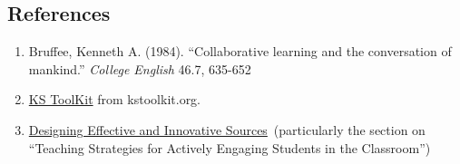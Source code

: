 \subsection{References}

\begin{enumerate}
\itemsep1pt\parskip0pt
\item
  Bruffee, Kenneth A. (1984). ``Collaborative learning and the
  conversation of mankind.'' \emph{College English} 46.7, 635-652
\item
  \href{http://www.kstoolkit.org/KS+Methods}{KS ToolKit} from kstoolkit.org.
\item
  \href{http://serc.carleton.edu/NAGTWorkshops/coursedesign/tutorial/strategies.html}{Designing
  Effective and Innovative Sources}~(particularly the section on
  ``Teaching Strategies for Actively Engaging Students in the
  Classroom'')
\end{enumerate}
